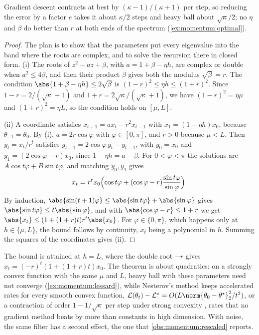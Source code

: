 \begin{refsection}
Gradient descent contracts at best by $(\kappa-1)/(\kappa+1)$ per step, so reducing the error by a factor $e$ takes it about $\kappa/2$ steps and heavy ball about $\sqrt\kappa/2$; no $\eta$ and $\beta$ do better than $r$ at both ends of the spectrum (\cref{ex:momentum:optimal}).

\begin{proof}
The plan is to show that the parameters put every eigenvalue into the band where the roots are complex, and to solve the recursion there in closed form. (i) The roots of $z^2-az+\beta$, with $a=1+\beta-\eta h$, are complex or double when $a^2\le4\beta$, and then their product $\beta$ gives both the modulus $\sqrt\beta=r$. The condition $\abs{1+\beta-\eta h}\le2\sqrt\beta$ is $(1-r)^2\le\eta h\le(1+r)^2$. Since $1-r=2/(\sqrt\kappa+1)$ and $1+r=2\sqrt\kappa/(\sqrt\kappa+1)$, we have $(1-r)^2=\eta\mu$ and $(1+r)^2=\eta L$, so the condition holds on $[\mu,L]$.

(ii) A coordinate satisfies $x_{t+1}=ax_t-r^2x_{t-1}$ with $x_1=(1-\eta h)x_0$, because $\theta_{-1}=\theta_0$. By (i), $a=2r\cos\varphi$ with $\varphi\in[0,\pi]$, and $r>0$ because $\mu<L$. Then $y_t=x_t/r^t$ satisfies $y_{t+1}=2\cos\varphi\,y_t-y_{t-1}$, with $y_0=x_0$ and $y_1=(2\cos\varphi-r)x_0$, since $1-\eta h=a-\beta$. For $0<\varphi<\pi$ the solutions are $A\cos t\varphi+B\sin t\varphi$, and matching $y_0,y_1$ gives
\[
  x_t=r^tx_0\Bigl(\cos t\varphi+(\cos\varphi-r)\frac{\sin t\varphi}{\sin\varphi}\Bigr).
\]
By induction, $\abs{\sin(t+1)\varphi}\le\abs{\sin t\varphi}+\abs{\sin\varphi}$ gives $\abs{\sin t\varphi}\le t\abs{\sin\varphi}$, and with $\abs{\cos\varphi-r}\le1+r$ we get $\abs{x_t}\le(1+(1+r)t)r^t\abs{x_0}$. For $\varphi\in\{0,\pi\}$, which happens only at $h\in\{\mu,L\}$, the bound follows by continuity, $x_t$ being a polynomial in $h$. Summing the squares of the coordinates gives (ii).
\end{proof}

The bound is attained at $h=L$, where the double root $-r$ gives $x_t=(-r)^t(1+(1+r)t)x_0$. The theorem is about quadratics: on a strongly convex function with the same $\mu$ and $L$, heavy ball with these parameters need not converge \parencite{LessardRechtPackard2016} (\cref{ex:momentum:lessard}), while Nesterov's method keeps accelerated rates for every smooth convex function, $\Loss(\theta_t)-\Loss^\star=O(L\norm{\theta_0-\theta^\star}_2^2/t^2)$, or a contraction of order $1-1/\sqrt\kappa$ per step under strong convexity \parencite{Nesterov1983,Nesterov2018}, rates that no gradient method beats by more than constants in high dimension. With noise, the same filter has a second effect, the one that \cref{obs:momentum:rescaled} reports.


\end{refsection}
